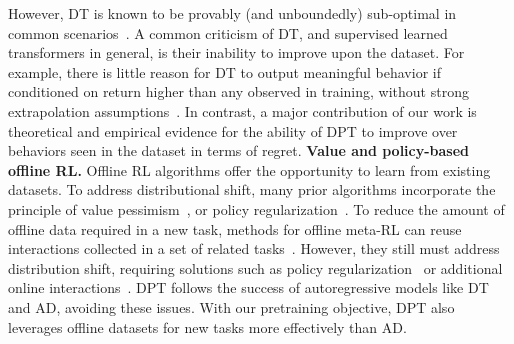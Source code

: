 \documentclass{article}
\begin{document}
However, DT is known to be provably (and unboundedly) sub-optimal in common scenarios~\citep{brandfonbrener2022does,yang2022dichotomy}. A common criticism of DT, and supervised learned transformers in general, is their inability to improve upon the dataset. For example, there is little reason for DT to output meaningful behavior if conditioned on return higher than any observed in training, without strong extrapolation assumptions~\citep{brandfonbrener2022does}.
In contrast, a major contribution of our work is theoretical and empirical evidence for the ability of DPT to improve over behaviors seen in the dataset in terms of regret.
\textbf{Value and policy-based offline RL.}
Offline RL algorithms offer the opportunity to learn from existing datasets.
To address distributional shift, many prior algorithms incorporate the principle of value pessimism~\citep{kumar2020conservative,yu2021combo,liu2020provably,ghasemipour2022so}, or policy regularization~\citep{fujimoto2019off,kumar2019stabilizing,wu2019behavior,siegel2020keep,liu2019off}.
To reduce the amount of offline data required in a new task, methods for offline meta-RL can reuse interactions collected in a set of related tasks~\citep{li2020focal,mitchell2021offline,dorfman2021offline}. However, they still must address distribution shift,  requiring solutions such as policy regularization~\citep{li2020focal} or additional online interactions~\citep{pong2022offline}.
DPT follows the success of autoregressive models like DT and AD, avoiding these issues. With our pretraining objective, DPT also leverages offline datasets for new tasks more effectively than AD.
\end{document}
